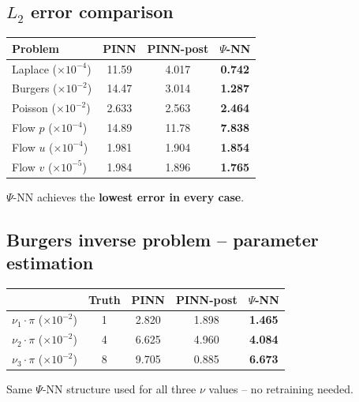 \documentclass[11pt,a4paper]{article}
\newcommand{\PsiNN}{$\Psi$-NN}
\begin{document}
\subsection{$L_2$ error comparison}

\begin{center}
\renewcommand{\arraystretch}{1.2}
\begin{tabular}{@{}l c c c@{}}
\toprule
\textbf{Problem} & \textbf{PINN} & \textbf{PINN-post} & \textbf{\PsiNN{}} \\
\midrule
Laplace ($\times10^{-4}$)  & 11.59 & 4.017 & \textbf{0.742} \\
Burgers ($\times10^{-2}$)  & 14.47 & 3.014 & \textbf{1.287} \\
Poisson ($\times10^{-2}$)  & 2.633 & 2.563 & \textbf{2.464} \\
Flow $p$ ($\times10^{-4}$) & 14.89 & 11.78 & \textbf{7.838} \\
Flow $u$ ($\times10^{-4}$) & 1.981 & 1.904 & \textbf{1.854} \\
Flow $v$ ($\times10^{-5}$) & 1.984 & 1.896 & \textbf{1.765} \\
\bottomrule
\end{tabular}
\end{center}

\PsiNN{} achieves the \textbf{lowest error in every case}.

\subsection{Burgers inverse problem -- parameter estimation}

\begin{center}
\renewcommand{\arraystretch}{1.2}
\begin{tabular}{@{}l c c c c@{}}
\toprule
& \textbf{Truth} & \textbf{PINN} & \textbf{PINN-post} & \textbf{\PsiNN{}} \\
\midrule
$\nu_1\!\cdot\!\pi$ ($\times10^{-2}$) & 1 & 2.820 & 1.898 & \textbf{1.465} \\
$\nu_2\!\cdot\!\pi$ ($\times10^{-2}$) & 4 & 6.625 & 4.960 & \textbf{4.084} \\
$\nu_3\!\cdot\!\pi$ ($\times10^{-2}$) & 8 & 9.705 & 0.885 & \textbf{6.673} \\
\bottomrule
\end{tabular}
\end{center}

Same \PsiNN{} structure used for all three $\nu$ values -- no retraining needed.
\end{document}
